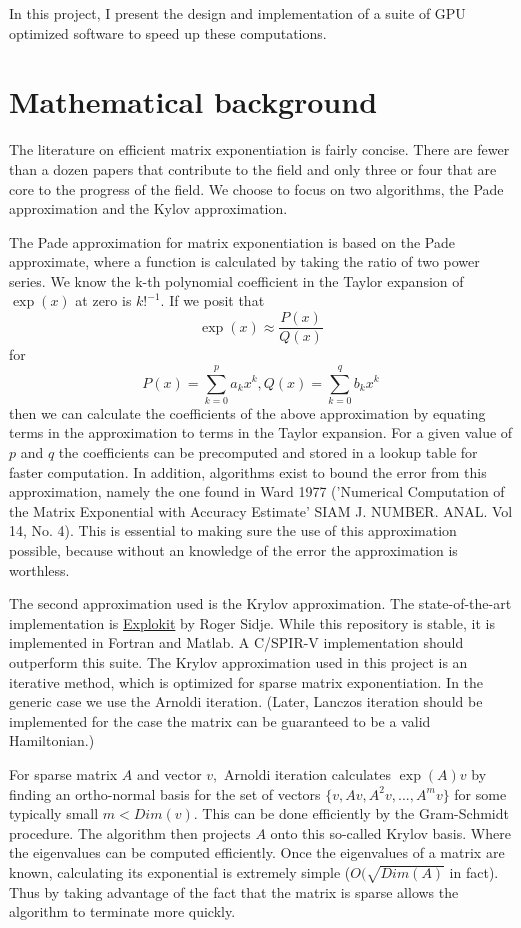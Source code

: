 \documentclass{article}
\theoremstyle{exampstyle} \newtheorem*{remark}{Remark}
\newcommand{\1}{\mathds{1}}
\begin{document}
In this project, I present the design and implementation of a suite of GPU optimized software to speed up these computations. %


\section{Mathematical background}

The literature on efficient matrix exponentiation is fairly concise. There are fewer than a dozen papers that contribute to the field and only three or four that are core to the progress of the field. We choose to focus on two algorithms, the Pade approximation and the Kylov approximation. %

The Pade approximation for matrix exponentiation is based on the Pade approximate, where a function is calculated by taking the ratio of two power series. We know the k-th polynomial coefficient in the Taylor expansion of $\exp(x)$ at zero is $k!^{-1}$. If we posit that 
$$ \exp(x)\approx\frac{P(x)}{Q(x)} $$
for 
$$ P(x)=\sum_{k=0}^p a_kx^k, Q(x)=\sum_{k=0}^q b_kx^k $$
then we can calculate the coefficients of the above approximation by equating terms in the approximation to terms in the Taylor expansion. For a given value of $p$ and $q$ the coefficients can be precomputed and stored in a lookup table for faster computation. In addition, algorithms exist to bound the error from this approximation, namely the one found in Ward 1977 ('Numerical Computation of the Matrix Exponential with Accuracy Estimate' SIAM J. NUMBER. ANAL. Vol 14, No. 4). This is essential to making sure the use of this approximation possible, because without an knowledge of the error the approximation is worthless. %

The second approximation used is the Krylov approximation. The state-of-the-art implementation is \href{http://www.maths.uq.edu.au/expokit/}{Explokit} by Roger Sidje. While this repository is stable, it is implemented in Fortran and Matlab. A C/SPIR-V implementation should outperform this suite. The Krylov approximation used in this project is an iterative method, which is optimized for sparse matrix exponentiation. In the generic case we use the Arnoldi iteration. (Later,   
Lanczos iteration should be implemented for the case the matrix can be guaranteed to be a valid Hamiltonian.)

For sparse matrix $A$ and vector $v,$ Arnoldi iteration calculates $\exp(A)v$ by finding an ortho-normal basis for the set of vectors $\{v,Av,A^2v,...,A^mv\}$ for some typically small $m<Dim(v)$. This can be done efficiently by the Gram-Schmidt procedure. The algorithm then projects $A$ onto this so-called Krylov basis. Where the eigenvalues can be computed efficiently. Once the eigenvalues of a matrix are known, calculating its exponential is extremely simple ($O(\sqrt{Dim(A)}$ in fact). Thus by taking advantage of the fact that the matrix is sparse allows the algorithm to terminate more quickly.
\end{document}
